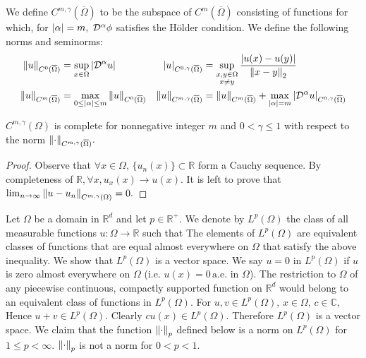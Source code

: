 We define $C^{m,\gamma}(\overline{\Omega})$ to be the subspace of $C^m(\overline{\Omega})$ consisting of functions for which, for $\abs{\alpha}=m,$ $\mathcal{D}^\alpha\phi$ satisfies the H\"older condition. We define the following norms and seminorms:
\begin{align}
    \norm{u}_{C^0(\overline{\Omega})} &= \sup_{x\in\Omega}\abs{\mathcal{D}^\alpha u}
    &
    \abs{u}_{C^{0,\gamma}(\overline{\Omega})} &= \sup_{\substack{x,y\in\Omega\\x\neq y}}\frac{\abs{u(x)-u(y)}}{\norm{x-y}_2}
    \\
    \norm{u}_{C^{m}(\overline{\Omega})} &= \max_{0\leq\abs{\alpha}\leq m}\norm{u}_{C^0(\overline{\Omega})}
    &
    \norm{u}_{C^{m,\gamma}(\overline{\Omega})} &= \norm{u}_{C^m(\overline{\Omega})}+\max_{\abs{\alpha}=m}\abs{\mathcal{D}^\alpha u}_{C^{0,\gamma}(\overline{\Omega})}
\end{align}
\begin{theorem}
    $C^{m,\gamma}(\Omega)$ is complete for nonnegative integer $m$ and $0<\gamma\leq1$ with respect to the norm $\norm{\cdot}_{C^{m,\gamma}(\overline{\Omega})}.$
\end{theorem}
\begin{proof}
    Observe that $\forall x\in\Omega,\,\{u_n(x)\}\subset\mathbb{R}$ form a Cauchy sequence. By completeness of $\mathbb{R},\forall x, u_x(x)\rightarrow u(x).$ It is left to prove that $\lim_{n\rightarrow\infty}\norm{u-u_n}_{C^{m,\gamma}(\Omega)}=0.$
\end{proof}
Let $\Omega$ be a domain in $\mathbb{R}^d$ and let $p\in\mathbb{R}^+.$ We denote by $L^p(\Omega)$ the class of all measurable functions $u:\Omega\rightarrow\mathbb{R}$ such that
The elements of $L^p(\Omega)$ are equivalent classes of functions that are equal almost everywhere on $\Omega$ that satisfy the above inequality. We show that $L^p(\Omega)$ is a vector space. We say $u=0$ in $L^p(\Omega)$ if $u$ is zero almost everywhere on $\Omega$ (i.e. $u(x)=0\,\mathrm{a.e.}$ in $\Omega$). The restriction to $\Omega$ of any piecewise continuous, compactly supported function on $\mathbb{R}^d$ would belong to an equivalent class of functions in $L^p(\Omega).$ For $u,v\in L^p(\Omega),\,x\in\Omega,\,c\in\mathbb{C},$
Hence $u+v\in L^p(\Omega).$ Clearly $cu(x)\in L^p(\Omega).$ Therefore $L^p(\Omega)$ is a vector space. We claim that the function $\norm{\cdot}_p$ defined below is a norm on $L^p(\Omega)$ for $1\leq p<\infty.$ $\norm{\cdot}_p$ is not a norm for $0<p<1.$
